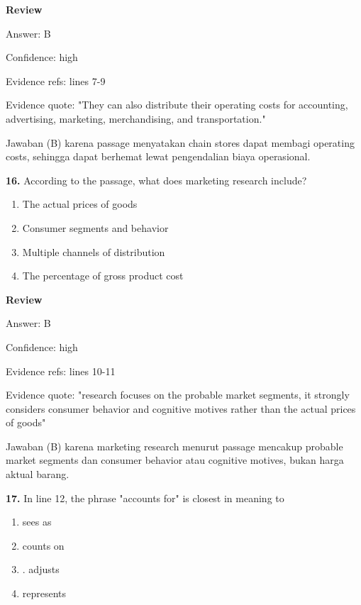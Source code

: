 \documentclass[12pt]{article}
\begin{document}
\textbf{Review}\par
Answer: B\par
Confidence: high\par
Evidence refs: lines 7-9\par
Evidence quote: "They can also distribute their operating costs for accounting, advertising, marketing, merchandising, and transportation."\par
Jawaban (B) karena passage menyatakan chain stores dapat membagi operating costs, sehingga dapat berhemat lewat pengendalian biaya operasional.\par
\endgroup
\par
\vspace{0.25\baselineskip}
\noindent\textbf{16.} According to the passage, what does marketing research include?
\begin{enumerate}[label=(\Alph*),leftmargin=*,itemsep=0.2em]
\item The actual prices of goods
\item Consumer segments and behavior
\item Multiple channels of distribution
\item The percentage of gross product cost
\end{enumerate}
\par
\begingroup
\setlength{\parskip}{0pt}
\setlength{\parindent}{0pt}
\textbf{Review}\par
Answer: B\par
Confidence: high\par
Evidence refs: lines 10-11\par
Evidence quote: "research focuses on the probable market segments, it strongly considers consumer behavior and cognitive motives rather than the actual prices of goods"\par
Jawaban (B) karena marketing research menurut passage mencakup probable market segments dan consumer behavior atau cognitive motives, bukan harga aktual barang.\par
\endgroup
\par
\vspace{0.25\baselineskip}
\noindent\textbf{17.} In line 12, the phrase "accounts for" is closest in meaning to
\begin{enumerate}[label=(\Alph*),leftmargin=*,itemsep=0.2em]
\item sees as
\item counts on
\item . adjusts
\item represents
\end{enumerate}
\end{document}
